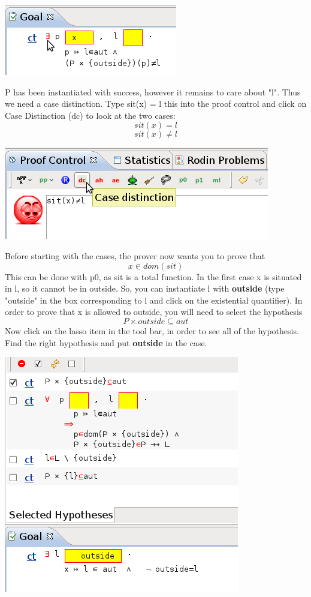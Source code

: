 \begin{center}
	\includegraphics[]{img/tutorial/tut_10_instantiate_p.png}
\end{center}

P has been instantiated with success, however it remains to care about "l". Thus we need a case distinction.
Type sit(x) = l this into the proof control and click on Case Distinction (dc) to look at the two cases:
\[
sit(x)=l 
\]
\[
sit(x) \neq l
\]
\begin{center}
	\includegraphics[]{img/tutorial/tut_10_case_distinction.png}
\end{center}

Before starting with the cases, the prover now wants you to prove that 
\[
 x \in dom(sit)
\]
This can be done with p0, as sit is a total function. In the first case x is situated in l, so it cannot be in outside. So, you can instantiate l with \textbf{outside} (type "outside" in the box corresponding to l and click on the existential quantifier). In order to prove that x is allowed to outside, you will need to select the hypothesis
\[
P \times outside \subseteq aut
\]
Now click on the lasso item in the tool bar, in order to see all of the hypothesis. Find the right hypothesis and put \textbf{outside} in the case.
\begin{center}
	\includegraphics[]{img/tutorial/tut_10_outside.png}
\end{center}

